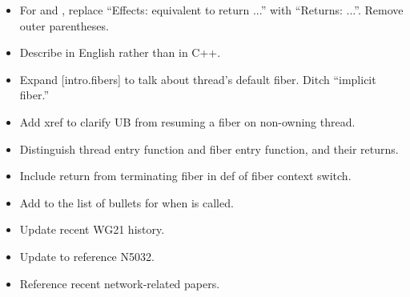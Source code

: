\begin{itemize}
\begin{itemize}
        \item Delete ``exposition-only'' when defining \emph{internal-resume}.
        \item Replace  with .
        \item Replace string of ``, then...'' with ``...the following sequence of steps in order.''
        \item Define composite \emph{internal-resume} with an internal decision.
        \item `` can be other than . ...'' =>
              `` can be other than ; ...''
        \item Add ``Suspends the running fiber'' to \effects.
    \end{itemize}
    \item For \emptyfn and , replace ``Effects: equivalent
          to return ...'' with ``Returns: ...''. Remove outer parentheses.
    \item Describe  in English rather than in C++.
    \item Expand [intro.fibers] to talk about thread's default fiber. Ditch
              ``implicit fiber.''
    \item Add xref to clarify UB from resuming a fiber on non-owning thread.
    \item Distinguish thread entry function and fiber entry function,
              and their returns.
    \item Include return from terminating fiber in def of fiber context
              switch.
    \item Add to the list of bullets for when  is called.
\end{itemize}


\begin{itemize}
    \item Update recent WG21 history.
\end{itemize}


\begin{itemize}
    \item Update to reference N5032.
    \item Reference recent network-related papers.
\end{itemize}

